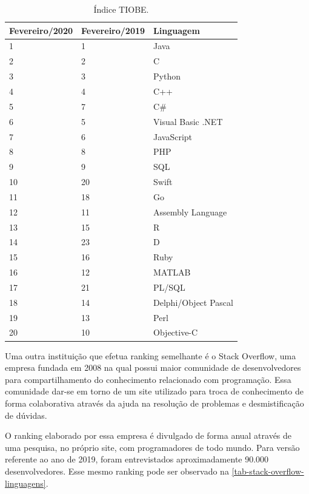 \begin{table}[htb]
\ABNTEXfontereduzida
\caption[Índice TIOBE]{Índice TIOBE.}
\label{tab-tiobe}
\begin{tabular}{p{2.6cm}|p{2.6cm}|p{4cm}}
   \textbf{Fevereiro/2020} & \textbf{Fevereiro/2019}  & \textbf{Linguagem}  \\
    \hline
    1 & 1 & Java \\
    \hline
    2 & 2 & C \\
    \hline
    3 & 3 & Python \\
    \hline
    4 & 4 & C++ \\
    \hline
    5 & 7 & C\# \\
    \hline
    6 & 5 & Visual Basic .NET \\
    \hline
    7 & 6 & JavaScript \\
    \hline
    8 & 8 & PHP \\
    \hline
    9 & 9 & SQL \\
    \hline
    10 & 20 & Swift \\
    \hline
    11 & 18 & Go \\
    \hline
    12 & 11 & Assembly Language \\
    \hline
    13 & 15 & R \\
    \hline
    14 & 23 & D \\
    \hline
    15 & 16 & Ruby \\
    \hline
    16 & 12 & MATLAB \\
    \hline
    17 & 21 & PL/SQL \\
    \hline
    18 & 14 & Delphi/Object Pascal \\
    \hline
    19 & 13 & Perl \\
    \hline
    20 & 10 & Objective-C \\
\end{tabular}
\end{table}

\newpage
Uma outra instituição que efetua ranking semelhante é o Stack Overflow, uma empresa fundada em 2008 na qual possui maior comunidade de desenvolvedores para compartilhamento do conhecimento relacionado com programação. Essa comunidade dar-se em torno de um site utilizado para troca de conhecimento de forma colaborativa através da ajuda na resolução de problemas e desmistificação de dúvidas.

O ranking elaborado por essa empresa é divulgado de forma anual através de uma pesquisa, no próprio site, com programadores de todo mundo. Para versão referente ao ano de 2019, foram entrevistados aproximadamente 90.000 desenvolvedores. Esse mesmo ranking pode ser observado na \autoref{tab-stack-overflow-linguagens}.


